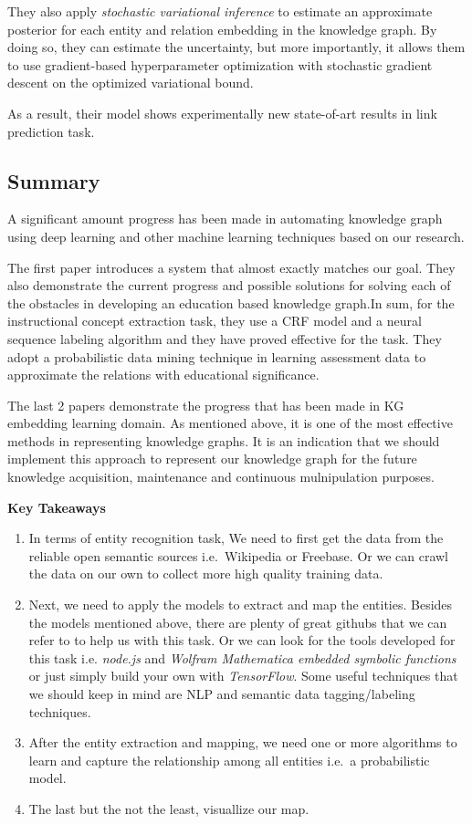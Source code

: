 \documentclass[]{book}
\theoremstyle{definition}
\theoremstyle{definition}
\theoremstyle{definition}
\theoremstyle{remark}
\begin{document}
They also apply \emph{stochastic variational inference} to estimate an
approximate posterior for each entity and relation embedding in the
knowledge graph. By doing so, they can estimate the uncertainty, but
more importantly, it allows them to use gradient-based hyperparameter
optimization with stochastic gradient descent on the optimized
variational bound.

As a result, their model shows experimentally new state-of-art results
in link prediction task.

\subsection{Summary}\label{summary}

A significant amount progress has been made in automating knowledge
graph using deep learning and other machine learning techniques based on
our research.

The first paper introduces a system that almost exactly matches our
goal. They also demonstrate the current progress and possible solutions
for solving each of the obstacles in developing an education based
knowledge graph.In sum, for the instructional concept extraction task,
they use a CRF model and a neural sequence labeling algorithm and they
have proved effective for the task. They adopt a probabilistic data
mining technique in learning assessment data to approximate the
relations with educational significance.

The last 2 papers demonstrate the progress that has been made in KG
embedding learning domain. As mentioned above, it is one of the most
effective methods in representing knowledge graphs. It is an indication
that we should implement this approach to represent our knowledge graph
for the future knowledge acquisition, maintenance and continuous
mulnipulation purposes.

\textbf{Key Takeaways}

\begin{enumerate}
\def\labelenumi{\arabic{enumi}.}
\item
  In terms of entity recognition task, We need to first get the data
  from the reliable open semantic sources i.e.~Wikipedia or Freebase. Or
  we can crawl the data on our own to collect more high quality training
  data.
\item
  Next, we need to apply the models to extract and map the entities.
  Besides the models mentioned above, there are plenty of great githubs
  that we can refer to to help us with this task. Or we can look for the
  tools developed for this task i.e. \emph{node.js} and \emph{Wolfram
  Mathematica embedded symbolic functions} or just simply build your own
  with \emph{TensorFlow}. Some useful techniques that we should keep in
  mind are NLP and semantic data tagging/labeling techniques.
\item
  After the entity extraction and mapping, we need one or more
  algorithms to learn and capture the relationship among all entities
  i.e.~a probabilistic model.
\item
  The last but the not the least, visuallize our map.
\end{enumerate}
\end{document}
